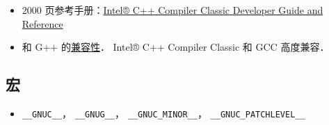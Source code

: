 
\begin{issues}
\issueDraft
\end{issues}

\begin{itemize}
\item 2000 页参考手册：\href{https://www.intel.com/content/www/us/en/develop/documentation/cpp-compiler-developer-guide-and-reference/top.html}{Intel® C++ Compiler Classic Developer Guide and Reference}
\item 和 G++ 的\href{https://www.intel.com/content/www/us/en/develop/documentation/cpp-compiler-developer-guide-and-reference/top/compatibility-and-portability/gcc-compatibility-and-interoperability.html}{兼容性}． Intel® C++ Compiler Classic 和 GCC 高度兼容．
\end{itemize}

\subsection{宏}
\begin{itemize}
\item \verb|__GNUC__|， \verb|__GNUG__|， \verb|__GNUC_MINOR__|， \verb|__GNUC_PATCHLEVEL__|
\end{itemize}


